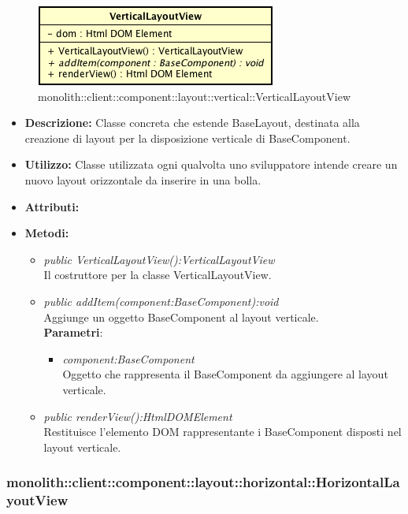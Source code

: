 \label{monolith::client::component::layout::vertical::VerticalLayoutView}
\begin{figure}[H]
	\centering
	\includegraphics[scale=0.5]{Sezioni/SottosezioniST/img/VerticalLayoutView.png}
	\caption{monolith::client::component::layout::vertical::VerticalLayoutView}
\end{figure}

\begin{itemize}
\item \textbf{Descrizione:} Classe concreta che estende BaseLayout, destinata alla creazione di layout per la disposizione verticale di BaseComponent.
\item \textbf{Utilizzo:} Classe utilizzata ogni qualvolta uno sviluppatore intende creare un nuovo layout orizzontale da inserire in una bolla.
\item \textbf{Attributi:}
\item \textbf{Metodi:}
\begin{itemize}
\item\textit{public VerticalLayoutView():VerticalLayoutView}\\
Il costruttore per la classe VerticalLayoutView.
\item \textit{public addItem(component:BaseComponent):void}\\
Aggiunge un oggetto BaseComponent al layout verticale.
\\ \textbf{Parametri}: \begin{itemize}
\item \textit{component:BaseComponent}\\
Oggetto che rappresenta il BaseComponent da aggiungere al layout verticale.
\end{itemize}
\item \textit{public renderView():HtmlDOMElement}\\
Restituisce l'elemento DOM rappresentante i BaseComponent disposti nel layout verticale.
\end{itemize}
\end{itemize}

\subsubsection{monolith::client::component::layout::horizontal::HorizontalLayoutView}

